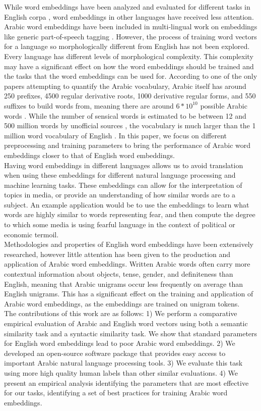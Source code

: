 While word embeddings have been analyzed and evaluated for different tasks in English corpa \cite{mikoloveffic:2013,dos2014deep}, word embeddings in other languages have received less attention. Arabic word embeddings have been included in multi-lingual work on embeddings like generic part-of-speech tagging \cite{al:2013}. However, the process of training word vectors for a language so morphologically different from English has not been explored. Every language has different levels of morphological complexity. This complexity may have a significant effect on how the word embeddings should be trained and the tasks that the word embeddings can be used for. According to one of the only papers attempting to quantify the Arabic vocabulary, Arabic itself has around 250 prefixes, 4500 regular derivative roots, 1000 derivative regular forms, and 550 suffixes to build words from, meaning there are around $6*10^10$ possible Arabic words \cite{ahmed2000alarge}. While the number of sensical words is estimated to be between 12 and 500 million words by unofficial sources \cite{Lameen:2013,Muhammad:2015}, the vocabulary is much larger than the 1 million word vocabulary of English \cite{Googl96:online}. In this paper, we focus on different preprocessing and training parameters to bring the performance of Arabic word embeddings closer to that of English word embeddings.
\\
Having word embeddings in different languages allows us to avoid translation when using these embeddings for different natural language processing and machine learning tasks. These embeddings can allow for the interpretation of topics in media, or provide an understanding of how similar words are to a subject. An example application would be to use the embeddings to learn what words are highly similar to words representing fear, and then compute the degree to which some media is using fearful language in the context of political or economic termoil.
\\
Methodologies and properties of English word embeddings have been extensively researched, however little attention has been given to the production and application of Arabic word embeddings. Written Arabic words often carry more contextual information about objects, tense, gender, and definiteness than English, meaning that Arabic unigrams occur less frequently on average than English unigrams. This has a significant effect on the training and application of Arabic word embeddings, as the embeddings are trained on unigram tokens.
\\
The contributions of this work are as follows: 1) We perform a comparative empirical evaluation of Arabic and English word vectors using both a semantic similarity task and a syntactic similarity task. We show that standard parameters for English word embeddings lead to poor Arabic word embeddings. 2) We developed an open-source software package that provides easy access to important Arabic natural language processing tools. 3) We evaluate this task using more high quality human labels than other similar evaluations. 4) We present an empirical analysis identifying the parameters that are most effective for our tasks, identifying a set of best practices for training Arabic word embeddings.
